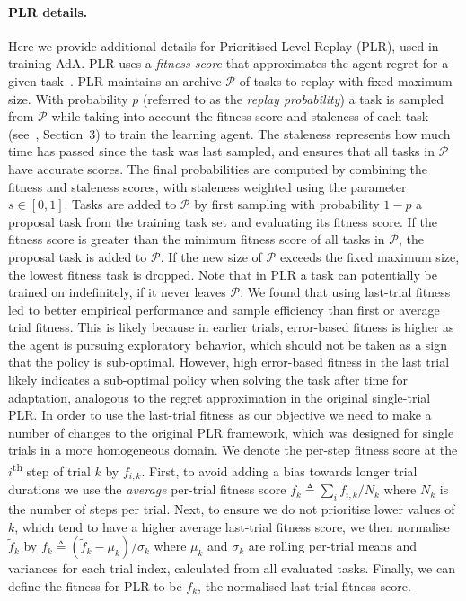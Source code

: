 \documentclass[11pt, a4paper, logo, copyright]{deepmind}
\begin{document}
\begin{appendix}
\paragraph{PLR details.}
Here we provide additional details for Prioritised Level Replay (PLR), used in training AdA. PLR uses a \emph{fitness score} that approximates the agent regret for a given task~\citep{jiang2021robustplr, jiang2020prioritized}. PLR maintains an archive $\mathcal{P}$ of tasks to replay with fixed maximum size. With probability $p$ (referred to as the \emph{replay probability}) a task is sampled from $\mathcal{P}$ while taking into account the fitness score and staleness of each task (see~\citet{jiang2020prioritized}, Section~3) to train the learning agent. The staleness represents how much time has passed since the task was last sampled, and ensures that all tasks in $\mathcal{P}$ have accurate scores. The final probabilities are computed by combining the fitness and staleness scores, with staleness weighted using the parameter $s\in[0,1]$.
Tasks are added to $\mathcal{P}$ by first sampling with probability $1-p$ a proposal task from the training task set and evaluating its fitness score. If the fitness score is greater than the minimum fitness score of all tasks in $\mathcal{P}$, the proposal task is added to $\mathcal{P}$. If the new size of $\mathcal{P}$ exceeds the fixed maximum size, the lowest fitness task is dropped. Note that in PLR a task can potentially be trained on indefinitely, if it never leaves $\mathcal{P}$.
We found that using last-trial fitness led to better empirical performance and sample efficiency than first or average trial fitness. This is likely because in earlier trials, error-based fitness is higher as the agent is pursuing exploratory behavior, which should not be taken as a sign that the policy is sub-optimal. However, high error-based fitness in the last trial likely indicates a sub-optimal policy when solving the task after time for adaptation, analogous to the regret approximation in the original single-trial PLR.
In order to use the last-trial fitness as our objective we need to make a number of changes to the original PLR framework, which was designed for single trials in a more homogeneous domain. We denote the per-step fitness score at the $i$\textsuperscript{th} step of trial $k$ by $f_{i, k}$. First, to avoid adding a bias towards longer trial durations we use the \emph{average} per-trial fitness score $\tilde{f}_k \triangleq \sum_i \tilde{f}_{i, k} / N_k$ where $N_k$ is the number of steps per trial. Next, to ensure we do not prioritise lower values of $k$, which tend to have a higher average last-trial fitness score, we then normalise $\tilde{f}_k$ by $f_k \triangleq (\tilde{f}_k - \mu_k) / \sigma_k$ where $\mu_k$ and $\sigma_k$ are rolling per-trial means and variances for each trial index, calculated from all evaluated tasks. Finally, we can define the fitness for PLR to be $f_k$, the normalised last-trial fitness score.

\end{appendix}
\end{document}
